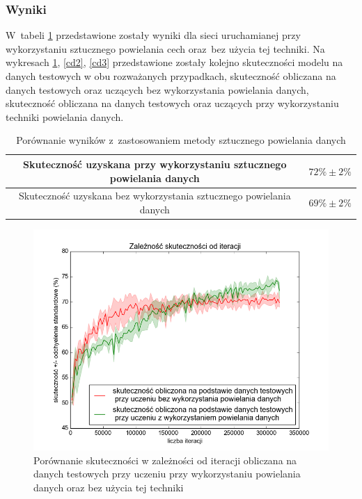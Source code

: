 \subsubsection{Wyniki}
W~tabeli \ref{table:catdogs} przedstawione zostały wyniki dla sieci uruchamianej przy wykorzystaniu sztucznego powielania cech oraz~bez użycia tej techniki. Na wykresach \ref{cd_1}, \ref{cd2}, \ref{cd3} przedstawione zostały kolejno skuteczności modelu na danych testowych w obu rozważanych przypadkach, skuteczność obliczana na danych testowych oraz uczących bez wykorzystania powielania danych, skuteczność obliczana na danych testowych oraz uczących przy wykorzystaniu techniki powielania danych.

\begin{table}
\centering
\begin{tabular}{|c|c|}
\hline
Skuteczność uzyskana przy wykorzystaniu sztucznego powielania danych & $72\% \pm 2\%$ \\
\hline 
Skuteczność uzyskana bez wykorzystania sztucznego powielania danych & $69\% \pm 2\%$ \\
\hline 
 \end{tabular}
 \caption{Porównanie wyników z~zastosowaniem metody sztucznego powielania danych} \label{table:catdogs}
\end{table}

\begin{figure}[ht!]
\centering
\includegraphics[scale=0.7]{res/comptest.png}
\caption[Caption for LOF]{Porównanie skuteczności w zależności od iteracji obliczana na danych testowych przy uczeniu przy wykorzystaniu powielania danych oraz bez użycia tej techniki\label{cd_1}}
\end{figure} 

